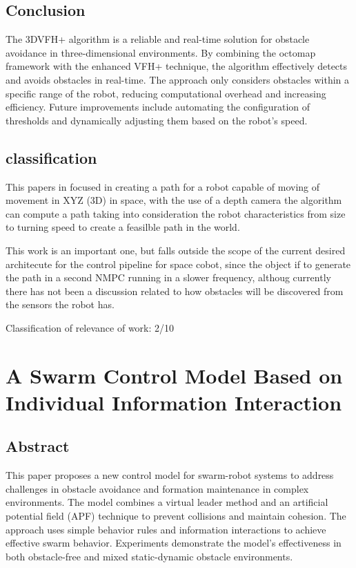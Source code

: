\documentclass[a4paper,12pt]{article}
\begin{document}
\subsection{Conclusion}
The 3DVFH+ algorithm is a reliable and real-time solution for obstacle avoidance in three-dimensional environments. By combining the octomap framework with the enhanced VFH+ technique, the algorithm effectively detects and avoids obstacles in real-time. The approach only considers obstacles within a specific range of the robot, reducing computational overhead and increasing efficiency. Future improvements include automating the configuration of thresholds and dynamically adjusting them based on the robot's speed.

\subsection{classification}

This papers in focused in creating a path for a robot capable of moving of movement in XYZ (3D) in space, with the use of a depth camera the algorithm can compute a path taking into consideration the robot characteristics from size to turning speed to create a feasilble path in the world.

This work is an important one, but falls outside the scope of the current desired architecute for the control pipeline for space cobot, since the object if to generate the path in a second NMPC running in a slower frequency, althoug currently there has not been a discussion related to how obstacles will be discovered from the sensors the robot has.

Classification of relevance of work: 2/10

\section{A Swarm Control Model Based on Individual
  Information Interaction}
\subsection{Abstract}
This paper proposes a new control model for swarm-robot systems to address challenges in obstacle avoidance and formation maintenance in complex environments. The model combines a virtual leader method and an artificial potential field (APF) technique to prevent collisions and maintain cohesion. The approach uses simple behavior rules and information interactions to achieve effective swarm behavior. Experiments demonstrate the model's effectiveness in both obstacle-free and mixed static-dynamic obstacle environments.
\end{document}
